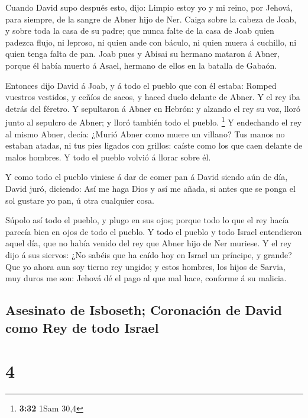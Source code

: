  Cuando David supo después esto, dijo: Limpio estoy yo y mi
reino, por Jehová, para siempre, de la sangre de Abner hijo de Ner.
 Caiga sobre la cabeza de Joab, y sobre toda la casa de su
padre; que nunca falte de la casa de Joab quien padezca flujo, ni
leproso, ni quien ande con báculo, ni quien muera á cuchillo, ni quien
tenga falta de pan.  Joab pues y Abisai su hermano mataron
á Abner, porque él había muerto á Asael, hermano de ellos en la batalla
de Gabaón.

 Entonces dijo David á Joab, y á todo el pueblo que con él
estaba: Romped vuestros vestidos, y ceñíos de sacos, y haced duelo
delante de Abner. Y el rey iba detrás del féretro.  Y
sepultaron á Abner en Hebrón: y alzando el rey su voz, lloró junto al
sepulcro de Abner; y lloró también todo el pueblo. \footnote{\textbf{3:32}
  1Sam 30,4}  Y endechando el rey al mismo Abner, decía:
¿Murió Abner como muere un villano?  Tus manos no estaban
atadas, ni tus pies ligados con grillos: caíste como los que caen
delante de malos hombres. Y todo el pueblo volvió á llorar sobre él.

 Y como todo el pueblo viniese á dar de comer pan á David
siendo aún de día, David juró, diciendo: Así me haga Dios y así me
añada, si antes que se ponga el sol gustare yo pan, ú otra cualquier
cosa.

 Súpolo así todo el pueblo, y plugo en sus ojos; porque
todo lo que el rey hacía parecía bien en ojos de todo el pueblo.
 Y todo el pueblo y todo Israel entendieron aquel día, que
no había venido del rey que Abner hijo de Ner muriese.  Y
el rey dijo á sus siervos: ¿No sabéis que ha caído hoy en Israel un
príncipe, y grande?  Que yo ahora aun soy tierno rey
ungido; y estos hombres, los hijos de Sarvia, muy duros me son: Jehová
dé el pago al que mal hace, conforme á su malicia.

\hypertarget{asesinato-de-isboseth-coronaciuxf3n-de-david-como-rey-de-todo-israel}{%
\subsection{Asesinato de Isboseth; Coronación de David como Rey de todo
Israel}\label{asesinato-de-isboseth-coronaciuxf3n-de-david-como-rey-de-todo-israel}}

\hypertarget{section-3}{%
\section{4}\label{section-3}}

